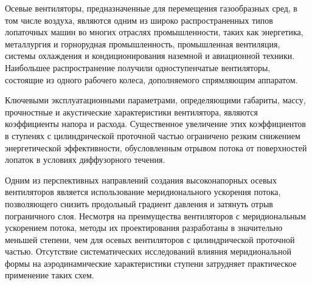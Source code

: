 {\actuality}

Осевые вентиляторы, предназначенные для перемещения газообразных сред, в том числе воздуха, являются одним из широко распространенных типов лопаточных машин во многих отраслях промышленности, таких как энергетика, металлургия и горнорудная промышленность, промышленная вентиляция, системы охлаждения и кондиционирования наземной и авиационной техники.
Наибольшее распространение получили одноступенчатые вентиляторы, состоящие из одного рабочего колеса, дополняемого спрямляющим аппаратом.

Ключевыми эксплуатационными параметрами, определяющими габариты, массу, прочностные и акустические характеристики вентилятора, являются коэффициенты напора и расхода.
Существенное увеличение этих коэффициентов в ступенях с цилиндрической проточной частью ограничено резким снижением энергетической эффективности, обусловленным отрывом потока от поверхностей лопаток в условиях диффузорного течения.

Одним из перспективных направлений создания высоконапорных осевых вентиляторов является использование меридионального ускорения потока, позволяющего снизить продольный градиент давления и затянуть отрыв пограничного слоя.
Несмотря на преимущества вентиляторов с меридиональным ускорением потока, методы их проектирования разработаны в значительно меньшей степени, чем для осевых вентиляторов с цилиндрической проточной частью.
Отсутствие систематических исследований влияния меридиональной формы на аэродинамические характеристики ступени затрудняет практическое применение таких схем.

